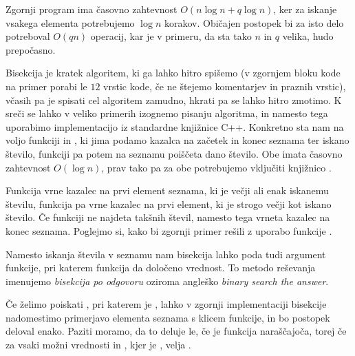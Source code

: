 Zgornji program ima časovno zahtevnost $O(n \log n + q \log n)$, ker za iskanje
vsakega elementa potrebujemo $\log n$ korakov.
Običajen postopek bi za isto delo potreboval $O(qn)$ operacij, kar je v primeru,
da sta tako $n$ in $q$ velika, hudo prepočasno.


Bisekcija je kratek algoritem, ki ga lahko hitro spišemo (v zgornjem bloku kode
na primer porabi le $12$ vrstic kode, če ne štejemo komentarjev in praznih
vrstic), včasih pa je spisati cel algoritem zamudno, hkrati pa se lahko hitro
zmotimo.
K sreči se lahko v veliko primerih izognemo pisanju algoritma, in namesto tega
uporabimo implementacijo iz standardne knjižnice C++.
Konkretno sta nam na voljo funkciji  in , ki
jima podamo kazalca na začetek in konec seznama ter iskano število, funkciji pa
potem na seznamu poiščeta dano število.
Obe imata časovno zahtevnost $O(\log n)$, prav tako pa za obe potrebujemo
vključiti knjižnico .

Funkcija  vrne kazalec na prvi element seznama, ki je večji
ali enak iskanemu številu, funkcija  pa vrne kazalec na prvi
element, ki je strogo večji kot iskano število.
Če funkciji ne najdeta takšnih števil, namesto tega vrneta kazalec na konec
seznama.
Poglejmo si, kako bi zgornji primer rešili z uporabo funkcije
.



Namesto iskanja števila v seznamu nam bisekcija lahko poda tudi argument
funkcije, pri katerem funkcija da določeno vrednost.
To metodo reševanja imenujemo \emph{bisekcija po odgovoru} oziroma angleško
\emph{binary search the answer}.

Če želimo poiskati , pri katerem je , lahko v zgornji
implementaciji bisekcije nadomestimo primerjavo elementa seznama s klicem
funkcije, in bo postopek deloval enako.
Paziti moramo, da to deluje le, če je funkcija  naraščajoča, torej če za
vsaki možni vrednosti  in , kjer je , velja
.

